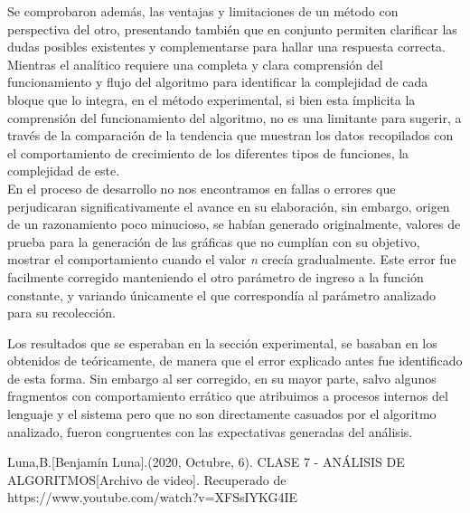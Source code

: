 \documentclass{report}
\begin{document}
    Se comprobaron además, las ventajas y limitaciones de un método con perspectiva del otro, presentando también que en conjunto permiten clarificar las dudas posibles existentes y complementarse para hallar una respuesta correcta. Mientras el analítico requiere una completa y clara comprensión del funcionamiento y flujo del algoritmo para identificar la complejidad de cada bloque que lo integra, en el método experimental, si bien esta ímplicita la comprensión del funcionamiento del algoritmo, no es una limitante para sugerir, a través de la comparación de la tendencia que muestran los datos recopilados con el comportamiento de crecimiento de los diferentes tipos de funciones, la complejidad de este.\\
    
    En el proceso de desarrollo no nos encontramos en fallas o errores que perjudicaran significativamente el avance en su elaboración, sin embargo, origen de un razonamiento poco minucioso, se habían generado originalmente, valores de prueba para la generación de las gráficas que no cumplían con su objetivo, mostrar el comportamiento cuando el valor \textit{n} crecía gradualmente. Este error fue facilmente corregido manteniendo el otro parámetro de ingreso a la función constante, y variando únicamente el que correspondía al parámetro analizado para su recolección.
    
    Los resultados que se esperaban en la sección experimental, se basaban en los obtenidos de teóricamente, de manera que el error explicado antes fue identificado de esta forma. Sin embargo al ser corregido, en su mayor parte, salvo algunos fragmentos con comportamiento errático que atribuimos a procesos internos del lenguaje y el sistema pero que no son directamente casuados por el algoritmo analizado, fueron congruentes con las expectativas generadas del análisis.
\newpage

\begin{thebibliography}{X}
    Luna,B.[Benjamín Luna].(2020, Octubre, 6). CLASE 7 - ANÁLISIS DE ALGORITMOS[Archivo de video]. Recuperado de https://www.youtube.com/watch?v=XFSsIYKG4IE
\end{thebibliography}
\end{document}
